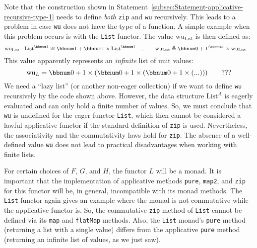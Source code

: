 Note that the construction shown in Statement~\ref{subsec:Statement-applicative-recursive-type-1}
needs to define \emph{both} \lstinline!zip! and \lstinline!wu! recursively.
This leads to a problem in case \lstinline!wu! does not have the
type of a function. A simple example when this problem occurs is with
the \lstinline!List! functor. The value $\text{wu}_{\text{List}}$
is then defined as:
\[
\text{wu}_{\text{List}}:\text{List}^{\bbnum 1}\cong\bbnum 1+\bbnum 1\times\text{List}^{\bbnum 1}\quad,\quad\quad\text{wu}_{\text{List}}\triangleq\bbnum 0+1^{:\bbnum 1}\times\text{wu}_{\text{List}}\quad.
\]
This value apparently represents an \emph{infinite} list of unit values:
\[
\text{wu}_{L}=\bbnum 0+1\times\left(\bbnum 0+1\times\left(\bbnum 0+1\times\left(...\right)\right)\right)\quad\quad???
\]
We need a \textsf{``}lazy list\textsf{''} (or another non-eager
collection) if we want to define \lstinline!wu! recursively by the
code shown above. However, the data structure $\text{List}^{A}$ is
eagerly evaluated and can only hold a finite number of values. So,
we must conclude that \lstinline!wu! is undefined for the eager functor
\lstinline!List!, which then cannot be considered a lawful applicative
functor if the standard definition of \lstinline!zip! is used. Nevertheless,
the associativity and the commutativity laws hold for \lstinline!zip!.
The absence of a well-defined value \lstinline!wu! does not lead
to practical disadvantages when working with finite lists. 

For certain choices of $F$, $G$, and $H$, the functor $L$ will
be a monad. It is important that the implementation of applicative
methods \lstinline!pure!, \lstinline!map2!, and \lstinline!zip!
for this functor will be, in general, incompatible with its monad
methods. The \lstinline!List! functor again gives an example where
the monad is not commutative while the applicative functor is. So,
the commutative \lstinline!zip! method of \lstinline!List! cannot
be defined via its \lstinline!map! and \lstinline!flatMap! methods.
Also, the \lstinline!List! monad\textsf{'}s \lstinline!pure! method (returning
a list with a single value) differs from the applicative \lstinline!pure!
method (returning an infinite list of values, as we just saw).

